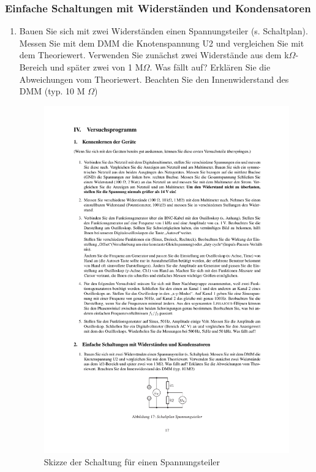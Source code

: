 \documentclass[12pt]{scrartcl}
\begin{document}
\subsubsection{Einfache Schaltungen mit Widerständen und Kondensatoren} 
\begin{enumerate}
\item
Bauen Sie sich mit zwei Widerständen einen Spannungsteiler (s. Schaltplan). Messen Sie mit dem DMM die Knotenspannung U2 und vergleichen Sie mit dem Theoriewert. Verwenden Sie zunächst zwei Widerstände aus dem k$\Omega$-Bereich und später zwei von 1 M$\Omega$. Was fällt auf? Erklären Sie die Abweichungen vom Theoriewert. Beachten Sie den Innenwiderstand des DMM (typ. 10 M
$\Omega$)
\begin{figure}[htbp] 
  \centering
    \includegraphics[trim = 30mm 35mm 1mm 228mm, clip, scale = 1]{spannungsteiler.pdf}
  	\caption[Skizze der Schaltung für einen Spannungsteiler]{Skizze der Schaltung für einen Spannungsteiler\footnotemark}
  \label{fig:spannungsteiler}
\end{figure}
\newpage
{}


\end{enumerate}
\end{document}
